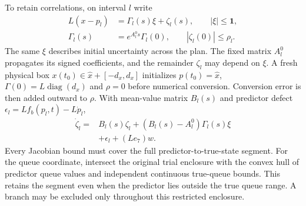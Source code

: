 \documentclass[preprint,12pt]{elsarticle}
\begin{document}
To retain correlations, on interval $l$ write
\begin{equation}
 \begin{aligned}
 L(x-p_l)&=\Gamma_l(s)\xi+\zeta_l(s),\qquad |\xi|\le\mathbf1,\\
 \Gamma_l(s)&=e^{A_l^0s}\Gamma_l(0),\qquad |\zeta_l(0)|\le\rho_l.
 \end{aligned}
 \label{eq:structure-affine-set}
\end{equation}
The same $\xi$ describes initial uncertainty across the plan. The fixed
matrix $A_l^0$ propagates its signed coefficients, and the remainder
$\zeta_l$ may depend on $\xi$. A fresh physical box
$x(t_0)\in\widehat x+[-d_x,d_x]$ initializes
$p(t_0)=\widehat x$, $\Gamma(0)=L\operatorname{diag}(d_x)$ and $\rho=0$
before numerical conversion. Conversion error is then added outward to $\rho$.
With mean-value matrix $B_l(s)$ and predictor defect
$\epsilon_l=Lf_b(p_l,t)-L\dot p_l$,
\begin{equation}
 \begin{aligned}
 \dot\zeta_l={}&B_l(s)\zeta_l+(B_l(s)-A_l^0)\Gamma_l(s)\xi\\
              &+\epsilon_l+(Le_7)w.
 \end{aligned}
 \label{eq:structure-remainder-identity}
\end{equation}
Every Jacobian bound must cover the full predictor-to-true-state segment.
For the queue coordinate, intersect the original trial enclosure with the
convex hull of predictor queue values and independent continuous true-queue
bounds. This retains the segment even when the predictor lies outside the
true queue range. A branch may be excluded only throughout this restricted
enclosure.
\end{document}
